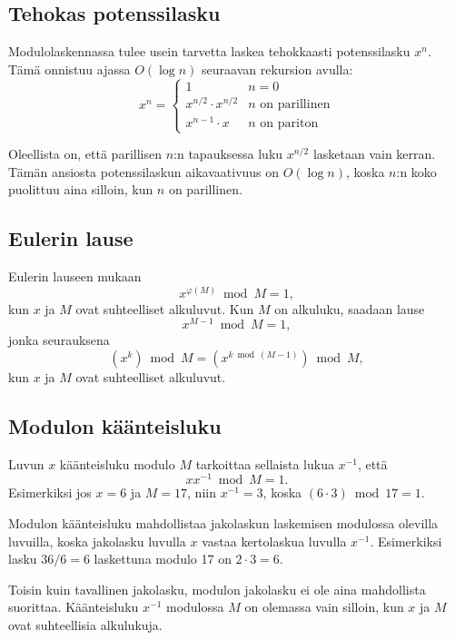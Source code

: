 \subsection{Tehokas potenssilasku}

Modulolaskennassa tulee usein tarvetta laskea
tehokkaasti potenssilasku $x^n$.
Tämä onnistuu ajassa $O(\log n)$
seuraavan rekursion avulla:
\begin{equation*}
    x^n = \begin{cases}
               1        & n = 0\\
               x^{n/2} \cdot x^{n/2} & \text{$n$ on parillinen}\\
               x^{n-1} \cdot x & \text{$n$ on pariton}
           \end{cases}
\end{equation*}

Oleellista on, että parillisen $n$:n
tapauksessa luku $x^{n/2}$ lasketaan vain kerran.
Tämän ansiosta potenssilaskun aikavaativuus on $O(\log n)$,
koska $n$:n koko puolittuu aina silloin,
kun $n$ on parillinen.

\subsection{Eulerin lause}

Eulerin lauseen mukaan
\[x^{\varphi(M)} \bmod M = 1,\]
kun $x$ ja $M$ ovat suhteelliset alkuluvut.
Kun $M$ on alkuluku, saadaan lause
\[x^{M-1} \bmod M = 1,\]
jonka seurauksena
\[(x^k) \bmod M =  (x^{k \bmod (M-1)}) \bmod M,\]
kun $x$ ja $M$ ovat suhteelliset alkuluvut.

\subsection{Modulon käänteisluku}

Luvun $x$ käänteisluku modulo $M$
tarkoittaa sellaista lukua $x^{-1}$,
että
\[ x x^{-1} \bmod M = 1. \]
Esimerkiksi jos $x=6$ ja $M=17$,
niin $x^{-1}=3$, koska $(6\cdot3) \bmod 17=1$.

Modulon käänteisluku mahdollistaa
jakolaskun laskemisen modulossa
olevilla luvuilla,
koska jakolasku luvulla $x$ vastaa
kertolaskua luvulla $x^{-1}$.
Esimerkiksi lasku $36/6=6$ laskettuna
modulo 17 on $2 \cdot 3 = 6$.

Toisin kuin tavallinen jakolasku,
modulon jakolasku ei ole aina mahdollista suorittaa.
Käänteisluku $x^{-1}$ modulossa $M$
on olemassa vain silloin,
kun $x$ ja $M$ ovat suhteellisia alkulukuja.

